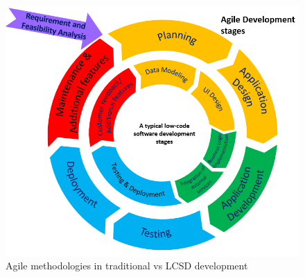


\begin{figure}[t]
\centering
\includegraphics[scale=.50]{res/development_cycle.PNG}
\caption{Agile methodologies in traditional vs  LCSD development}
\label{fig:low-code-agile}
\vspace{-5mm}
\end{figure}

